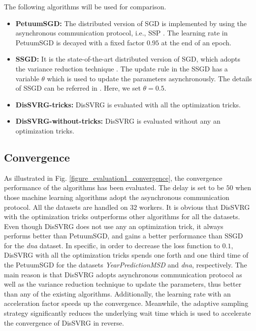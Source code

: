 \documentclass[preprint,review,11pt,a4paper]{elsarticle}
\begin{document}
The following algorithms will be  used for comparison.
\begin{itemize}
\item \textbf{PetuumSGD:} The distributed version of SGD is implemented by using the asynchronous communication protocol, i.e., SSP \cite{Xing:2015ib}.  The learning rate in PetuumSGD is decayed with a fixed factor $0.95$ at the end of an epoch.
\item \textbf{SSGD:} It is the state-of-the-art distributed version of SGD, which adopts the variance reduction technique \cite{Zhang:2015tp}. The update rule in the SSGD has a variable $\theta$ which is used to update the parameters asynchronously. The details of SSGD can be referred in \cite{Zhang:2015tp}. Here, we set $\theta=0.5$.
\item \textbf{DisSVRG-tricks:} DisSVRG is evaluated with all the optimization tricks.
\item \textbf{DisSVRG-without-tricks:} DisSVRG is evaluated without any an optimization tricks.
\end{itemize}
\subsection{Convergence}
As illustrated in Fig. \ref{figure_evaluation1_convergence}, the  convergence performance of the algorithms has been evaluated. The delay is set to be $50$ when those machine learning algorithms adopt the asynchronous communication protocol. All the datasets are handled on $32$ workers.  It is obvious that DisSVRG with the optimization tricks outperforms other algorithms for all the datasets. Even though DisSVRG does not use any an optimization trick, it always performs better than PetuumSGD, and gains a better performance than SSGD for the \emph{dna} dataset. In specific, in order to decrease the loss function to $0.1$, DisSVRG with all the optimization tricks spends one forth and one third time of the PetuumSGD for the datasets \emph{YearPredictionMSD} and \emph{dna}, respectively.  The main reason is that DisSVRG adopts asynchronous communication protocol as well as the variance reduction technique to update the parameters, thus better than any of the existing algorithms. Additionally, the  learning rate with an acceleration factor speeds up the convergence. Meanwhile, the adaptive sampling strategy significantly reduces the underlying wait time which is used to accelerate the convergence of DisSVRG in reverse.
\end{document}
